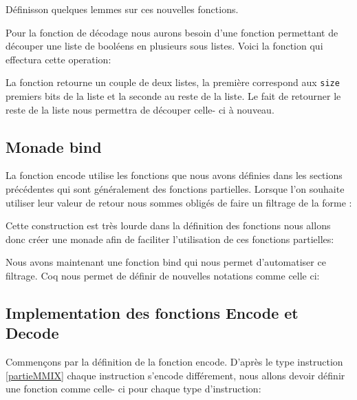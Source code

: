 \documentclass {article}
\newcommand{\codefrom}[3]
           {}
\theoremstyle{definition}
\theoremstyle{remark}
\newcommand{\fun}[1]{\lstinline!#1!}
\begin{document}
Définisson quelques lemmes sur ces nouvelles fonctions.
\codefrom{src}{encode}{operand_to_bin_hypothesis_reg}
\codefrom{src}{encode}{operand_to_bin_hypothesis_imm}
\codefrom{src}{encode}{operand_to_bin_size}


Pour la fonction de décodage nous aurons besoin d'une fonction permettant de découper
une liste de booléens en plusieurs sous listes. Voici la fonction qui effectura cette operation:

\codefrom{src}{encode}{get_first_n_bit}

La fonction retourne un couple de deux listes, la première correspond aux \fun{size} premiers
bits de la liste et la seconde au reste  de la liste. Le fait de retourner le reste de la liste
nous permettra de découper celle- ci à nouveau.





\subsection{Monade bind}

La fonction encode utilise les fonctions que nous avons définies dans les sections précédentes qui sont généralement
des fonctions partielles. Lorsque l'on souhaite utiliser leur valeur de retour nous sommes obligés de faire un
filtrage de la forme :

\codefrom{rapport}{definitions}{pattern_matching}

Cette construction est très lourde dans la définition des fonctions nous allons donc créer une monade
afin de faciliter l'utilisation de ces fonctions partielles:

\codefrom{src}{encode}{monade}

Nous avons maintenant une fonction bind qui nous permet d'automatiser ce filtrage. Coq nous permet de
définir de nouvelles notations comme celle ci:

\codefrom{src}{encode}{notation}




\subsection{Implementation des fonctions Encode et Decode}

Commençons par la définition de la fonction encode. D'après le type instruction \ref{partieMMIX}
chaque instruction s'encode différement, nous allons devoir définir une fonction comme celle- ci
pour chaque type d'instruction:
\end{document}
